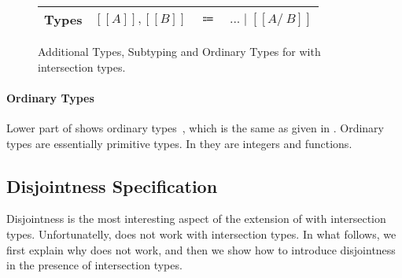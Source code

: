 \begin{figure}[t]
    \centering
    \begin{tabular}{lrcl} \toprule
      Types & $[[A]], [[B]]$ & $\Coloneqq$ & $ ... \mid [[A /\ B]] $ \\
      \bottomrule
    \end{tabular}
    \centering
    \centering
  \caption{Additional Types, Subtyping and Ordinary Types for \cal with intersection types.}
  \label{fig:inter:system}
\end{figure}

\paragraph{Ordinary Types}
Lower part of
 shows ordinary types~\cite{davies2000intersection}, 
which is the same as given in .
Ordinary types are essentially primitive types. In \cal they
are integers and functions. 

\subsection{Disjointness Specification}
\label{sec:inter:disj}
Disjointness is the most interesting aspect of the extension of \cal with
intersection types. Unfortunatelly,  does not work with intersection
types. In what follows, we first explain why  does not work, and then
we show how to introduce disjointness in the presence of intersection types. 

